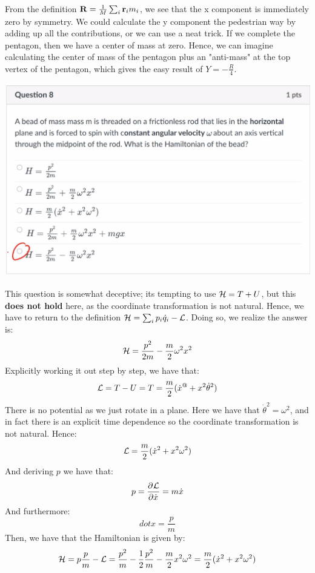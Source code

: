 \documentclass[../PHYS306Notes.tex]{subfiles}
\begin{document}
\begin{s}
From the definition $\mathbf{R} = \frac{1}{M}\sum_i \mathbf{r}_im_i$, we see that the x component is immediately zero by symmetry. We could calculate the y component the pedestrian way by adding up all the contributions, or we can use a neat trick. If we complete the pentagon, then we have a center of mass at zero. Hence, we can imagine calculating the center of mass of the pentagon plus an "anti-mass" at the top vertex of the pentagon, which gives the easy result of $Y = -\frac{R}{4}$.
\end{s}

\begin{center}
    \includegraphics[scale=0.7]{Lecture-34/l34-img5.png}
\end{center}
\begin{s}
This question is somewhat deceptive; its tempting to use $\mathcal{H} = T + U$, but this \textbf{does not hold} here, as the coordinate transformation is not natural. Hence, we have to return to the definition $\mathcal{H} = \sum_i p_i\dot{q}_i - \mathcal{L}$. Doing so, we realize the answer is:
\[\mathcal{H} = \frac{p^2}{2m} - \frac{m}{2}\omega^2 x^2\]
Explicitly working it out step by step, we have that:
\[\mathcal{L} = T - U = T = \frac{m}{2}(\dot{x}^@ + x^2\dot{\theta}^2) \]
There is no potential as we just rotate in a plane. Here we have that $\dot{\theta}^2 = \omega^2$, and in fact there is an explicit time dependence so the coordinate transformation is not natural. Hence:
\[\mathcal{L} = \frac{m}{2}(\dot{x}^2 + x^2\omega^2)\]
And deriving $p$ we have that:
\[p = \dpd{\LL}{\dot{x}} = m\dot{x}\]
And furthermore:
\[dot{x} = \frac{p}{m}\]
Then, we have that the Hamiltonian is given by:
\[\mathcal{H} = p\frac{p}{m} - \mathcal{L} = \frac{p^2}{m} - \frac{1}{2}\frac{p^2}{m} - \frac{m}{2}x^2\omega^2 = \frac{m}{2}(\dot{x}^2 + x^2\omega^2)\]
\end{s}
\end{document}
